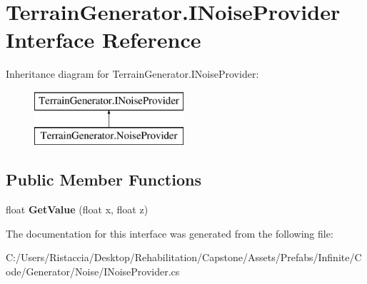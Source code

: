 \hypertarget{interface_terrain_generator_1_1_i_noise_provider}{}\section{Terrain\+Generator.\+I\+Noise\+Provider Interface Reference}
\label{interface_terrain_generator_1_1_i_noise_provider}
Inheritance diagram for Terrain\+Generator.\+I\+Noise\+Provider\+:\begin{figure}[H]
\begin{center}
\leavevmode
\includegraphics[height=2.000000cm]{interface_terrain_generator_1_1_i_noise_provider}
\end{center}
\end{figure}
\subsection*{Public Member Functions}
\begin{DoxyCompactItemize}
\item 
\mbox{\label{interface_terrain_generator_1_1_i_noise_provider_a8ea738ee87521fdaa19069365b528c46}} 
float {\bfseries Get\+Value} (float x, float z)
\end{DoxyCompactItemize}


The documentation for this interface was generated from the following file\+:\begin{DoxyCompactItemize}
\item 
C\+:/\+Users/\+Ristaccia/\+Desktop/\+Rehabilitation/\+Capstone/\+Assets/\+Prefabs/\+Infinite/\+Code/\+Generator/\+Noise/I\+Noise\+Provider.\+cs\end{DoxyCompactItemize}
